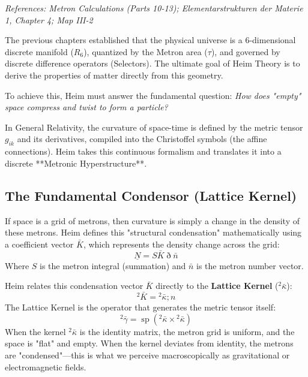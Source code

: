 \documentclass[11pt,a4paper,oneside]{article}
\DeclareMathOperator{\spn}{sp}
\newcommand{\ethop}{\eth}
\begin{document}
\textit{References: Metron Calculations (Parts 10-13); Elementarstrukturen der Materie 1, Chapter 4; Map III-2}

The previous chapters established that the physical universe is a 6-dimensional discrete manifold ($R_6$), quantized by the Metron area ($\tau$), and governed by discrete difference operators (Selectors). The ultimate goal of Heim Theory is to derive the properties of matter directly from this geometry. 

To achieve this, Heim must answer the fundamental question: \textit{How does "empty" space compress and twist to form a particle?}

In General Relativity, the curvature of space-time is defined by the metric tensor $g_{ik}$ and its derivatives, compiled into the Christoffel symbols (the affine connections). Heim takes this continuous formalism and translates it into a discrete **Metronic Hyperstructure**. 

\subsection{The Fundamental Condensor (Lattice Kernel)}

If space is a grid of metrons, then curvature is simply a change in the density of these metrons. Heim defines this "structural condensation" mathematically using a coefficient vector $\bar{K}$, which represents the density change across the grid:
\begin{equation}
    \underline{N} = S \bar{K} \ethop \bar{n}
\end{equation}
Where $S$ is the metron integral (summation) and $\bar{n}$ is the metron number vector. 

Heim relates this condensation vector $\bar{K}$ directly to the \textbf{Lattice Kernel} (${}^2 \bar{\kappa}$):
\begin{equation}
    {}^2 \bar{K} = {}^2 \bar{\kappa}; n
\end{equation}
The Lattice Kernel is the operator that generates the metric tensor itself:
\begin{equation}
    {}^2 \bar{\gamma} = \spn({}^2 \bar{\kappa} \times {}^2 \bar{\kappa})
\end{equation}
When the kernel ${}^2 \bar{\kappa}$ is the identity matrix, the metron grid is uniform, and the space is "flat" and empty. When the kernel deviates from identity, the metrons are "condensed"—this is what we perceive macroscopically as gravitational or electromagnetic fields.
\end{document}
